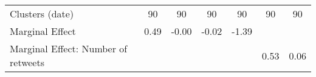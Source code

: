 {\begin{tabular}{l*{6}{c}}
Clusters (date)     &          90         &          90         &          90         &          90         &          90         &          90         \\
Marginal Effect     &        0.49         &       -0.00         &       -0.02         &       -1.39         &                     &                     \\
Marginal Effect: Number of retweets&                     &                     &                     &                     &        0.53         &        0.06         \\
\hline\hline
\end{tabular}
}
